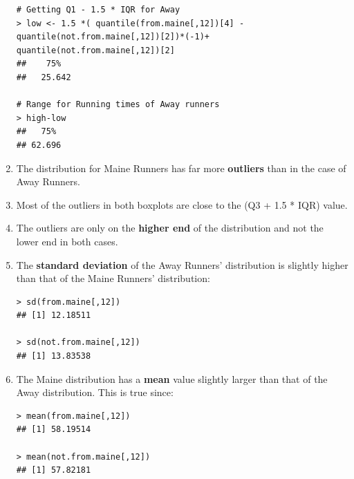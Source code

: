 \documentclass[12pt,letterpaper,titlepage,en-US]{article}
\begin{document}
\begin{enumerate}
\begin{knitrout}
\begin{kframe}
\begin{verbatim}
# Getting Q1 - 1.5 * IQR for Away
> low <- 1.5 *( quantile(from.maine[,12])[4] - 
quantile(not.from.maine[,12])[2])*(-1)+ quantile(not.from.maine[,12])[2]
##    75% 
##   25.642 

# Range for Running times of Away runners
> high-low
##   75% 
## 62.696 

\end{verbatim}
\end{kframe}
\end{knitrout}


\item The distribution for Maine Runners has far more \textbf{outliers} than in the case of Away Runners.

\item Most of the outliers in both boxplots are close to the (Q3 + 1.5 * IQR) value.

\item The outliers are only on the \textbf{higher end} of the distribution and not the lower end in both cases.



\item The \textbf{standard deviation} of the Away Runners' distribution is slightly higher than that of the Maine Runners' distribution:
\begin{knitrout}
\color{fgcolor}
\begin{kframe}

\begin{verbatim}
> sd(from.maine[,12])
## [1] 12.18511

> sd(not.from.maine[,12])
## [1] 13.83538
\end{verbatim}
\end{kframe}
\end{knitrout}



\item The Maine distribution has a \textbf{mean} value slightly larger than that of the Away distribution. This is true since:

\begin{knitrout}
\color{fgcolor}
\begin{kframe}

\begin{verbatim}
> mean(from.maine[,12])
## [1] 58.19514

> mean(not.from.maine[,12])
## [1] 57.82181

\end{verbatim}
\end{kframe}
\end{knitrout}

\end{enumerate}
\end{document}
